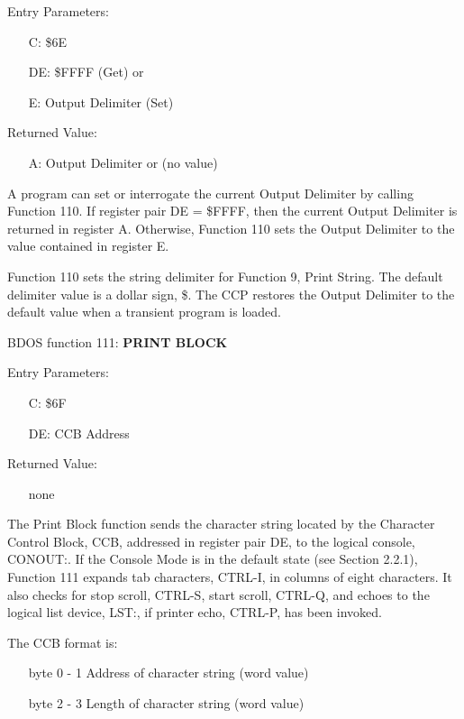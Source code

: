 Entry Parameters:
\begin{itemize}
\item[] C: \$6E
\item[] DE: \$FFFF (Get) or
\item[] E: Output Delimiter (Set)
\end{itemize}

Returned Value:
\begin{itemize}
\item[] A: Output Delimiter or (no value)
\end{itemize}

A program can set or interrogate the current Output Delimiter by
calling Function 110. If register pair DE = \$FFFF, then the current
Output Delimiter is returned in register A. Otherwise, Function 110
sets the Output Delimiter to the value contained in register E.

Function 110 sets the string delimiter for Function 9, Print
String. The default delimiter value is a dollar sign, \$. The CCP
restores the Output Delimiter to the default value when a transient
program is loaded.

BDOS function 111: \textbf{PRINT BLOCK}

Entry Parameters:
\begin{itemize}
\item[] C: \$6F
\item[] DE: CCB Address
\end{itemize}

Returned Value:
\begin{itemize}
\item[] none
\end{itemize}

The Print Block function sends the character string located by the
Character Control Block, CCB, addressed in register pair DE, to the
logical console, CONOUT:. If the Console Mode is in the default state
(see Section 2.2.1), Function 111 expands tab characters, CTRL-I, in
columns of eight characters. It also checks for stop scroll, CTRL-S,
start scroll, CTRL-Q, and echoes to the logical list device, LST:, if
printer echo, CTRL-P, has been invoked.

The CCB format is:
\begin{itemize}
\item[byte] 0 - 1 Address of character string (word value)
\item[byte] 2 - 3 Length of character string (word value)
\end{itemize}

